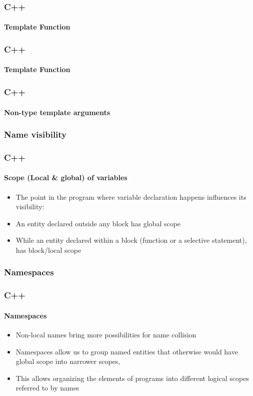\documentclass[hyperref={pdfpagelabels=true}]{beamer}
\begin{document}
\begin{frame}[shrink]
\frametitle{C++}
\framesubtitle{Template Function}
\begin{tcolorbox}[title= ,width=11.85 cm]
\tiny

\end{tcolorbox}
\end{frame}


\begin{frame}[shrink]
\frametitle{C++}
\framesubtitle{Template Function}
\begin{tcolorbox}[title= ,width=11.85 cm]
\tiny

\end{tcolorbox}
\end{frame}

\begin{frame}[shrink]
\frametitle{C++}
\framesubtitle{Non-type template arguments}
\begin{tcolorbox}[title= ,width=11.85 cm]
\tiny

\end{tcolorbox}
\end{frame}

\subsubsection{Name visibility}
\begin{frame}[shrink]
\frametitle{C++}
\framesubtitle{Scope (Local \& global) of variables}
\begin{itemize}[<+->]
\item The point in the program where variable declaration happens influences its visibility:
\item An entity declared outside any block has global scope
\item While an entity declared within a block (function or a selective statement), has block/local scope
\end{itemize}
\pause
\begin{tcolorbox}[title= ,width=9.85 cm]

\end{tcolorbox}
\end{frame}

\subsubsection{Namespaces}
\begin{frame}[shrink]
\frametitle{C++}
\framesubtitle{Namespaces}
\begin{itemize}[<+->]
\item Non-local names bring more possibilities for name collision
\item Namespaces allow us to group named entities that otherwise would have global scope into narrower scopes,
\item This allows organizing the elements of programs into different logical scopes referred to by names
\end{itemize}
\pause
\begin{tcolorbox}[title= ,width=9.85 cm]

\end{tcolorbox}
\end{frame}
\end{document}
